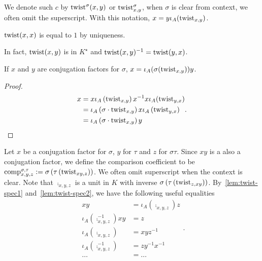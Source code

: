 We denote such $c$ by $\operatorname{twist}^{\sigma}(x, y)$ or $\operatorname{twist}^{\sigma}_{x, y}$, when $\sigma$ is clear from context, we often omit the superscript. With this notation, $x = y\iota_{A}(\operatorname{twist}_{x,y})$.

\begin{remark}
  $\operatorname{twist}(x, x)$ is equal to $1$ by uniqueness.
\end{remark}

\begin{remark}
  In fact, $\operatorname{twist}(x, y)$ is in $K^{\star}$ and $\operatorname{twist}(x, y)^{-1}=\operatorname{twist}(y, x)$.
\end{remark}

\begin{lemma}\label{lem:twist-spec2}
  If $x$ and $y$ are conjugation factors for $\sigma$, $x=\iota_{A}(\sigma(\operatorname{twist}_{x, y}))y$.
  \leanok
\end{lemma}
\begin{proof}
  \[
    \begin{aligned}
      x &= x \iota_{A}\left(\operatorname{twist}_{x,y}\right) x^{-1} x \iota_{A}(\operatorname{twist}_{y,x}) \\
        &= \iota_{A}\left(\sigma\cdot\operatorname{twist}_{x,y}\right)x\iota_{A}\left(
          \operatorname{twist}_{y,x}\right)\\
      &=\iota_{A}\left(\sigma\cdot \operatorname{twist}_{x,y}\right)y
    \end{aligned}.
  \]
\end{proof}

\begin{construction}\label{con:compare-conj-factors}
  Let $x$ be a conjugation factor for $\sigma$, $y$ for $\tau$ and $z$ for $\sigma\tau$. Since $xy$ is a also a conjugation factor, we define the comparison coefficient to be $\operatorname{comp}^{\sigma, \tau}_{x,y,z}:=\sigma\left(\tau\left(\operatorname{twist}_{xy, z}\right)\right)$. We often omit superscript when the context is clear. Note that $\comp_{x,y,z}$ is a unit in $K$ with inverse $\sigma\left(\tau\left(\operatorname{twist}_{z, xy}\right)\right)$. By~\cref{lem:twist-spec1} and~\cref{lem:twist-spec2}, we have the following useful equalities
  \[
    \begin{aligned}
      xy &= \iota_{A}\left(\comp_{x,y,z}\right)z \\
      \iota_{A}\left(\comp_{x,y,z}^{-1}\right)xy &= z \\
      \iota_{A}\left(\comp_{x,y,z}\right) &= xyz^{-1}\\
      \iota_{A}\left(\comp_{x,y,z}^{-1}\right) &= zy^{-1}x^{-1}\\
      \dots &=\dots
    \end{aligned}.
  \]
  \leanok
\end{construction}

